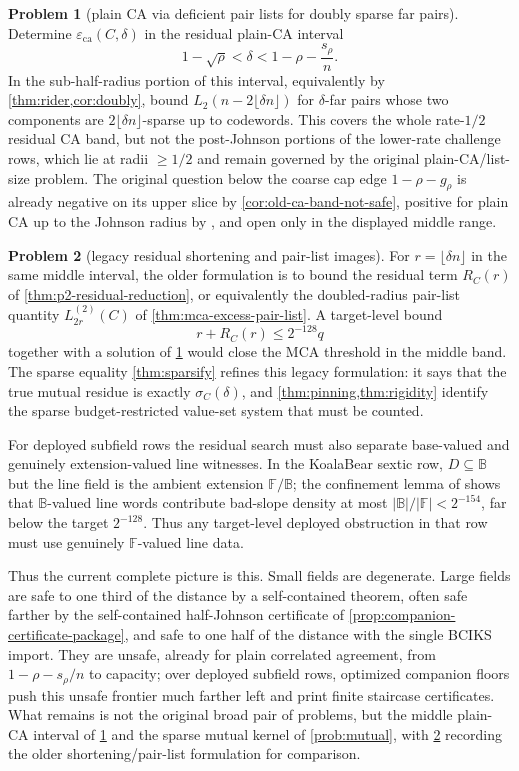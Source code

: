 \documentclass[11pt]{amsart}
\theoremstyle{definition}
\newtheorem{problem}[problem]{Problem}
\theoremstyle{remark}
\newcommand{\F}{\mathbb{F}}
\newcommand{\B}{\mathbb{B}}
\newcommand{\eca}{\varepsilon_{\mathrm{ca}}}
\begin{document}
\begin{problem}[plain CA via deficient pair lists for doubly sparse far pairs]\label{prob:ca}\label{prob:deficient}
Determine $\eca(C,\delta)$ in the residual plain-CA interval
\[
        1-\sqrt\rho<\delta<1-\rho-\frac{s_\rho}{n}.
\]
In the sub-half-radius portion of this interval, equivalently by \cref{thm:rider,cor:doubly}, bound $L_2(n-2\lfloor\delta n\rfloor)$ for $\delta$-far pairs whose two components are $2\lfloor\delta n\rfloor$-sparse up to codewords.  This covers the whole rate-$1/2$ residual CA band, but not the post-Johnson portions of the lower-rate challenge rows, which lie at radii $\ge1/2$ and remain governed by the original plain-CA/list-size problem.  The original question below the coarse cap edge $1-\rho-g_\rho$ is already negative on its upper slice by \cref{cor:old-ca-band-not-safe}, positive for plain CA up to the Johnson radius by \cite{BCIKS20,BCHKS25}, and open only in the displayed middle range.
\end{problem}

\begin{problem}[legacy residual shortening and pair-list images]\label{prob:legacy-mutual}
For $r=\lfloor\delta n\rfloor$ in the same middle interval, the older formulation is to bound the residual term $R_C(r)$ of \cref{thm:p2-residual-reduction}, or equivalently the doubled-radius pair-list quantity $L_{2r}^{(2)}(C)$ of \cref{thm:mca-excess-pair-list}.  A target-level bound
\[
        r+R_C(r)\le2^{-128}q
\]
together with a solution of \cref{prob:ca} would close the MCA threshold in the middle band.  The sparse equality \cref{thm:sparsify} refines this legacy formulation: it says that the true mutual residue is exactly $\sigma_C(\delta)$, and \cref{thm:pinning,thm:rigidity} identify the sparse budget-restricted value-set system that must be counted.
\end{problem}

For deployed subfield rows the residual search must also separate base-valued and genuinely extension-valued line witnesses.  In the KoalaBear sextic row, $D\subseteq\B$ but the line field is the ambient extension $\F/\B$; the confinement lemma of \cite{Cho26b} shows that $\B$-valued line words contribute bad-slope density at most $|\B|/|\F|<2^{-154}$, far below the target $2^{-128}$.  Thus any target-level deployed obstruction in that row must use genuinely $\F$-valued line data.

Thus the current complete picture is this.  Small fields are degenerate.  Large fields are safe to one third of the distance by a self-contained theorem, often safe farther by the self-contained half-Johnson certificate of \cref{prop:companion-certificate-package}, and safe to one half of the distance with the single BCIKS import.  They are unsafe, already for plain correlated agreement, from $1-\rho-s_\rho/n$ to capacity; over deployed subfield rows, optimized companion floors push this unsafe frontier much farther left and print finite staircase certificates.  What remains is not the original broad pair of problems, but the middle plain-CA interval of \cref{prob:ca} and the sparse mutual kernel of \cref{prob:mutual}, with \cref{prob:legacy-mutual} recording the older shortening/pair-list formulation for comparison.
\end{document}
